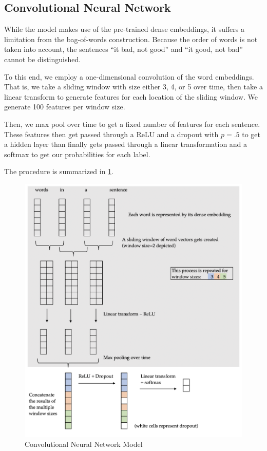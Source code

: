 \documentclass[11pt]{article}
\begin{document}
\subsection{Convolutional Neural Network}
\label{subsec:convnet}

While the  model makes use of the pre-trained dense
embeddings, it suffers a limitation from the bag-of-words construction. Because
the order of words is not taken into account, the sentences ``it bad, not good''
and ``it good, not bad'' cannot be distinguished. 

To this end, we employ a one-dimensional convolution of the word embeddings.
That is, we take a sliding window with size either 3, 4, or 5 over time, then
take a linear transform to generate features for each location of the sliding
window. We generate 100 features per window size.

Then, we max pool over time to get a fixed number of features for each sentence.
These features then get passed through a ReLU and a dropout with $p=.5$ to get a
hidden layer than finally gets passed through a linear transformation and a
softmax to get our probabilities for each label.

The procedure is summarized in \cref{fig:convnet}.

\begin{figure}[htb]
\centering
\includegraphics[width=\textwidth]{figs/convnet.png}
\caption{Convolutional Neural Network Model}
\label{fig:convnet}
\end{figure}
\end{document}
